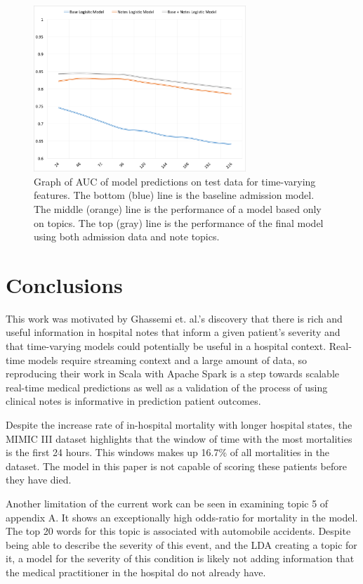 \documentclass[journal]{IEEEtran}
\begin{document}
\begin{figure}[ht]
\includegraphics[width=8cm]{auc}
\caption{Graph of AUC of model predictions on test data for time-varying features.   The bottom (blue) line is the baseline admission model. The middle (orange) line is the performance of a model based only on topics.  The top (gray) line is the performance of the final model using both admission data and note topics.}
\end{figure}


\section{Conclusions}

This work was motivated by Ghassemi et. al.’s  discovery that there is rich and useful information in hospital notes that inform a given patient's severity and that time-varying models could potentially be useful in a hospital context.  Real-time models require streaming context and a large amount of data, so reproducing their work in Scala with Apache Spark is a step towards scalable real-time medical predictions as well as a validation of the process of using clinical notes is informative in prediction patient outcomes.

Despite the increase rate of in-hospital mortality with longer hospital states, the MIMIC III dataset highlights that the window of time with the most mortalities is the first 24 hours.  This windows makes up 16.7\% of all mortalities in the dataset.  The model in this paper is not capable of scoring these patients before they have died.

Another limitation of the current work can be seen in examining topic 5 of appendix A.  It shows an exceptionally high odds-ratio for mortality in the model.  The top 20 words for this topic is associated with automobile accidents.  Despite being able to describe the severity of this event, and the LDA creating a topic for it, a model for the severity of this condition is likely not adding information that the medical practitioner in the hospital do not already have.
\end{document}
